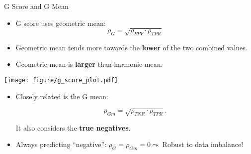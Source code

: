 \documentclass[11pt,compress,t,notes=noshow, xcolor=table]{beamer}
\begin{document}
\begin{vbframe}{G Score and G Mean}
	\footnotesize
	
	\begin{minipage}[c]{0.5\textwidth}
	\footnotesize
	\begin{itemize}
		\item G score uses geometric mean: 
		$$\rho_{G} = \sqrt{\rho_{PPV} \cdot \rho_{TPR}}$$
		\item Geometric mean tends more towards the \textbf{lower} of the two combined values.
        \item Geometric mean is \textbf{larger} than harmonic mean.
	\end{itemize}
\end{minipage}%
\begin{minipage}[c]{0.5\textwidth}
	\centering
	\texttt{[image: figure/g\_score\_plot.pdf]}
\end{minipage}

\begin{itemize}
	\item Closely related is the G mean:

	$$\rho_{Gm} = \sqrt{\rho_{TNR} \cdot \rho_{TPR}}.$$

	It also considers the \textbf{true negatives}.
	
	\item Always predicting \enquote{negative}: $\rho_{G} = \rho_{Gm}  = 0 \leadsto$ Robust to data imbalance!

\end{itemize}
	
\end{vbframe}
\end{document}
